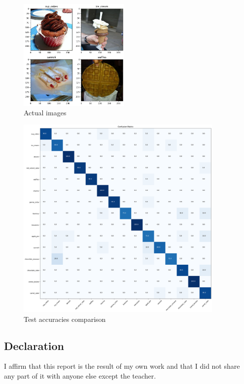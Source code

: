 \documentclass{article}
\begin{document}
\begin{multicols}{2}
    \begin{figure}[H]
        \centering
        \includegraphics[width=0.48\textwidth]{wrong_pred_images.png}
        \caption{\small Actual images}
        \label{fig:wrong_pred_images}
    \end{figure}



\end{multicols}

        \begin{figure}[H]
            \centering
            \includegraphics[width=0.9\textwidth]{confmat.png}
            \caption{\small Test accuracies comparison}
            \label{fig:confmat}
        \end{figure}




\vfill
\subsection*{\normalsize Declaration}
I aﬃrm that this report is the result of my own work and that I did not share any part of it with anyone else except the teacher.
\end{document}
